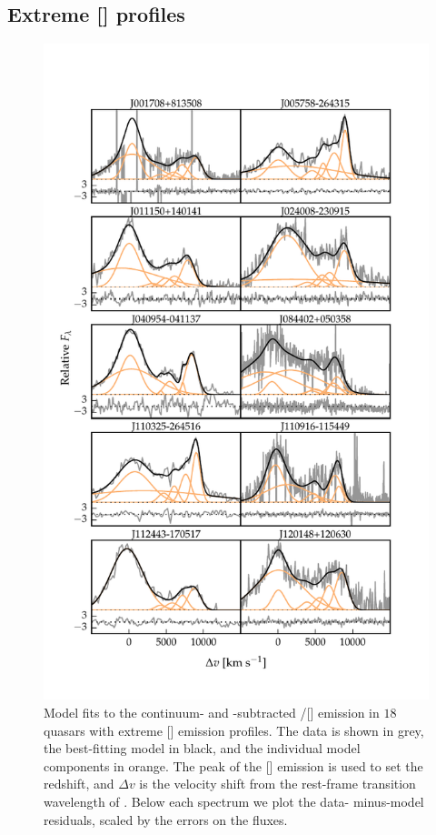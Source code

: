 \subsection{Extreme [] profiles}
\label{sec:extreme_oiii}

\begin{figure}
    \centering
    \includegraphics[width=\columnwidth]{figures/chapter04/example_spectrum_grid_extreme_oiii_1.pdf}
    \caption[{Model fits to the \hbns/[] emission in $18$ quasars with extreme [] emission profiles.}]{Model fits to the continuum- and -subtracted \hbns/[] emission in $18$ quasars with extreme [] emission profiles. The data is shown in grey, the best-fitting model in black, and the individual model components in orange. The peak of the [] emission is used to set the redshift, and $\Delta{v}$ is the velocity shift from the rest-frame transition wavelength of \hbns. Below each spectrum we plot the data- minus-model residuals, scaled by the errors on the fluxes.}
    \label{fig:example_spectrum_grid_extreme_oiii}
\end{figure}

